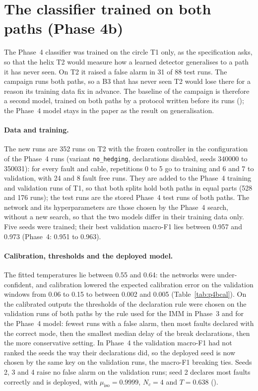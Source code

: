 \documentclass[10pt]{article}
\begin{document}
\section{The classifier trained on both paths (Phase 4b)}\label{sec:p4b}

The Phase~4 classifier was trained on the circle T1 only, as the specification asks, so that the helix T2 would measure how a learned detector generalises to a path it has never seen. On T2 it raised a false alarm in 31 of 88 test runs. The campaign runs both paths, so a B3 that has never seen T2 would lose there for a reason its training data fix in advance. The baseline of the campaign is therefore a second model, trained on both paths by a protocol written before its runs (); the Phase~4 model stays in the paper as the result on generalisation.

\paragraph{Data and training.} The new runs are 352 runs on T2 with the frozen controller in the configuration of the Phase~4 runs (variant \texttt{no\_hedging}, declarations disabled, seeds 340000 to 350031): for every fault and cable, repetitions 0 to 5 go to training and 6 and 7 to validation, with 24 and 8 fault free runs. They are added to the Phase~4 training and validation runs of T1, so that both splits hold both paths in equal parts (528 and 176 runs); the test runs are the stored Phase~4 test runs of both paths. The network and its hyperparameters are those chosen by the Phase~4 search, without a new search, so that the two models differ in their training data only. Five seeds were trained; their best validation macro-F1 lies between 0.957 and 0.973 (Phase~4: 0.951 to 0.963).

\paragraph{Calibration, thresholds and the deployed model.} The fitted temperatures lie between 0.55 and 0.64: the networks were under-confident, and calibration lowered the expected calibration error on the validation windows from 0.06 to 0.15 to between 0.002 and 0.005 (Table~\ref{tab:p4bcal}). On the calibrated outputs the thresholds of the declaration rule were chosen on the validation runs of both paths by the rule used for the IMM in Phase~3 and for the Phase~4 model: fewest runs with a false alarm, then most faults declared with the correct mode, then the smallest median delay of the break declarations, then the more conservative setting. In Phase~4 the validation macro-F1 had not ranked the seeds the way their declarations did, so the deployed seed is now chosen by the same key on the validation runs, the macro-F1 breaking ties. Seeds 2, 3 and 4 raise no false alarm on the validation runs; seed 2 declares most faults correctly and is deployed, with $\mu_{\mathrm{iso}}=0.9999$, $N_c=4$ and $T=0.638$ ().
\end{document}
